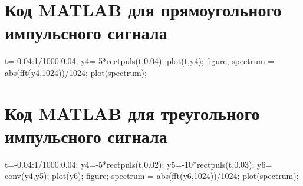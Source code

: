 \documentclass[10pt,a4paper]{report}
\begin{document}
\section{Код MATLAB для прямоугольного импульсного сигнала}
t=-0.04:1/1000:0.04;\newline
y4=-5*rectpuls(t,0.04);\newline
plot(t,y4);\newline
figure;\newline
spectrum = abs(fft(y4,1024))/1024;\newline
plot(spectrum);\newline
\section{Код MATLAB для треугольного импульсного сигнала}
t=-0.04:1/1000:0.04;\newline
y4=-5*rectpuls(t,0.02);\newline
y5=-10*rectpuls(t,0.03);\newline
y6= conv(y4,y5);\newline
plot(y6);\newline
figure;\newline
spectrum = abs(fft(y6,1024))/1024;\newline
plot(spectrum);\newline
\end{document}
